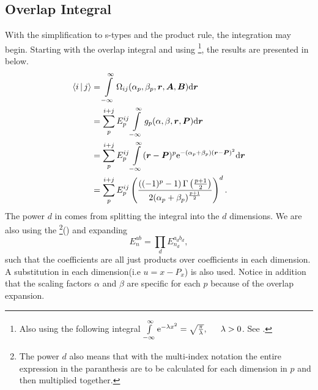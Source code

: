 \subsection{Overlap Integral\label{susec:overlapIntegral}}
    With the simplification to s-types and the product rule, the integration
    may begin. Starting with the overlap integral and using
    \footnote{Also using the following integral $\infint
    \me^{-\lambda x^2} = \sqrt{\frac{\pi}{\lambda}},\indent \lambda>0$. See
    \cite{handbookmath}.}, the results are presented in 
    below.
        \begin{align}
            \Braket{i|j} &= \int\limits^{\infty}_{-\infty}
            \Omega_{ij}(\alpha_p,\beta_p,\boldsymbol{{r}},\boldsymbol{{A}},\boldsymbol{{B}}) \mathrm{d}
            \boldsymbol{{r}} \nonumber \\
            &= \sum\limits^{i+j}_{p} E^{ij}_{p} \int\limits^{\infty}_{-\infty} g_p(\alpha,\beta,\boldsymbol{{r}},\boldsymbol{{P}})
            \mathrm{d}\boldsymbol{{r}} \nonumber \\
            &= \sum\limits^{i+j}_{p} E^{ij}_{p} \int\limits^{\infty}_{-\infty} (\boldsymbol{{r}}-\boldsymbol{{P}})^p \mathrm{e}^{-(\alpha_p +
            \beta_p)(\boldsymbol{{r}} - \boldsymbol{{P}})^2} \mathrm{d}\boldsymbol{{r}} \nonumber \\
            &= \sum\limits^{i+j}_{p} E^{ij}_{p}
            \left(\frac{\left((-1)^p-1\right)\Gamma\left(\frac{p+1}{2}\right)}
            {2(\alpha_p+\beta_p)^{\frac{p+1}{2}}}\right)^d
            \label{eq:stypeOverlap}.
        \end{align}
    The power $d$ in  comes from splitting the integral
    into the $d$ dimensions. We are also using the \footnote{The power $d$ also means that with the multi-index
    notation the entire expression in the paranthesis are to be calculated for
    each dimension in $p$ and then multiplied
    together.}() and expanding
        \begin{equation}
            E^{ab}_{n} = \prod_d E^{a_db_d}_{n_d},
            \label{eq:Enotation}
        \end{equation}
    such that the coefficients are all just products over coefficients in each
    dimension. A substitution in each dimension(i.e $u=x-P_x$) is also used.
    Notice in addition that the scaling factors $\alpha$ and $\beta$ are
    specific for each $p$ because of the overlap expansion.

